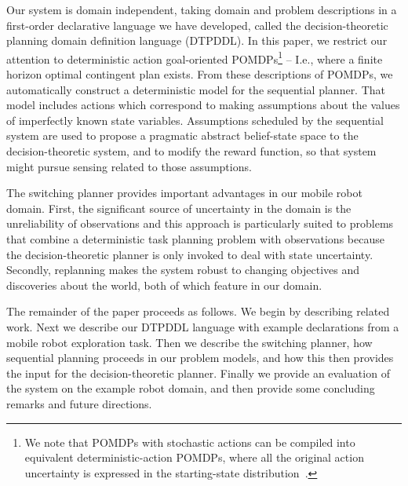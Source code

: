 Our system is domain independent, taking domain and problem
descriptions in a first-order declarative language we have developed,
called the decision-theoretic planning domain definition language
(DTPDDL). In this paper, we restrict our attention to deterministic
action goal-oriented POMDPs\footnote{We note that POMDPs with
stochastic actions can be compiled into equivalent
deterministic-action POMDPs, where all the original action uncertainty
is expressed in the starting-state
distribution~\cite{ng:Jordan:2000}.} -- I.e., where a finite horizon
optimal contingent plan exists.  
From these descriptions of POMDPs, we
automatically construct a deterministic model for the sequential
planner. That model includes actions which correspond to making
assumptions about the values of imperfectly known state
variables. Assumptions scheduled by the sequential system are used to
propose a pragmatic abstract belief-state space to the
decision-theoretic system, and to modify the reward function, so that
system might pursue sensing related to those assumptions.


The switching planner provides important advantages in our
mobile robot domain. First, the significant source of uncertainty in the
domain is the unreliability of observations and this approach is
particularly suited to problems that combine a deterministic task
planning problem with observations because the decision-theoretic planner
is only invoked to deal with state uncertainty.
Secondly, replanning makes the system robust to
changing objectives and discoveries about the world,
both of which feature in our domain.



The remainder of the paper proceeds as follows. We begin by describing
related work. Next we describe our DTPDDL language with example
declarations from a mobile robot exploration task. Then we describe
the switching planner, how sequential planning proceeds in our problem
models, and how this then provides the input for the
decision-theoretic planner. Finally we provide an evaluation of the
system on the example robot domain, and then provide some concluding
remarks and future directions.








